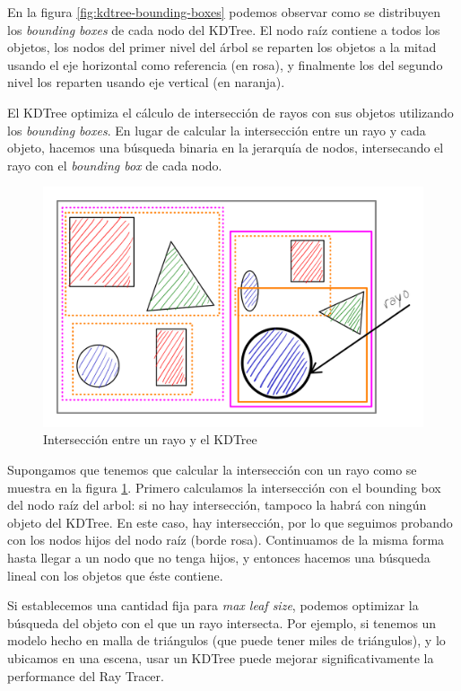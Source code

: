 En la figura \ref{fig:kdtree-bounding-boxes} podemos observar como se
distribuyen los \textit{bounding boxes} de cada nodo del KDTree. El nodo raíz
contiene a todos los objetos, los nodos del primer nivel del árbol se
reparten los objetos a la mitad usando el eje horizontal como referencia (en
rosa), y finalmente los del segundo nivel los reparten usando eje vertical (en
naranja).

El KDTree optimiza el cálculo de intersección de rayos con sus objetos
utilizando los \textit{bounding boxes}. En lugar de calcular la intersección
entre un rayo y cada objeto, hacemos una búsqueda binaria en la jerarquía de
nodos, intersecando el rayo con el \textit{bounding box} de cada nodo.

\begin{figure}[H]
  \centering
  \includegraphics[width=\textwidth]{imgs/kdtree-ray-intersection.png}
  \caption{Intersección entre un rayo y el KDTree}
  \label{fig:kdtree-ray-intersection}
\end{figure}

Supongamos que tenemos que calcular la intersección con un rayo como se muestra
en la figura \ref{fig:kdtree-ray-intersection}. Primero calculamos la
intersección con el bounding box del nodo raíz del arbol: si no hay
intersección, tampoco la habrá con ningún objeto del KDTree. En este caso, hay
intersección, por lo que seguimos probando con los nodos hijos del nodo raíz
(borde rosa). Continuamos de la misma forma hasta llegar a un nodo que no tenga
hijos, y entonces hacemos una búsqueda lineal con los objetos que éste contiene.

Si establecemos una cantidad fija para \textit{max leaf size}, podemos optimizar
la búsqueda del objeto con el que un rayo intersecta. Por ejemplo, si tenemos un
modelo hecho en malla de triángulos (que puede tener miles de triángulos), y lo
ubicamos en una escena, usar un KDTree puede mejorar significativamente la
performance del Ray Tracer.

